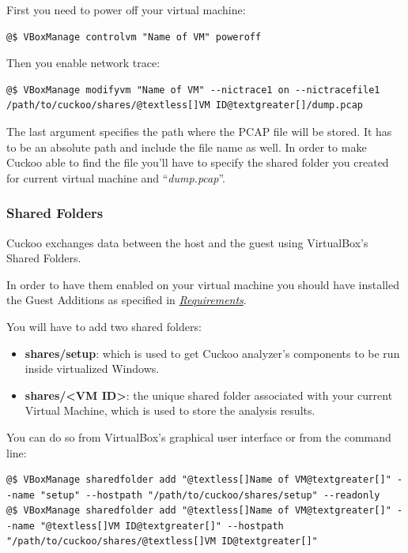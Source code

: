 \documentclass[letterpaper,10pt,english]{sphinxmanual}
\begin{document}
First you need to power off your virtual machine:

\begin{Verbatim}[commandchars=@\[\]]
@$ VBoxManage controlvm "Name of VM" poweroff
\end{Verbatim}

Then you enable network trace:

\begin{Verbatim}[commandchars=@\[\]]
@$ VBoxManage modifyvm "Name of VM" --nictrace1 on --nictracefile1 /path/to/cuckoo/shares/@textless[]VM ID@textgreater[]/dump.pcap
\end{Verbatim}

The last argument specifies the path where the PCAP file will be stored. It has
to be an absolute path and include the file name as well. In order to make
Cuckoo able to find the file you'll have to specify the shared folder you
created for current virtual machine and ``\emph{dump.pcap}''.


\subsubsection{Shared Folders}
\label{installation/guest/shares:shared-folders}\label{installation/guest/shares::doc}\label{installation/guest/shares:here}
Cuckoo exchanges data between the host and the guest using VirtualBox's Shared
Folders.

In order to have them enabled on your virtual machine you should have installed
the Guest Additions as specified in {\hyperref[installation/guest/requirements::doc]{\emph{Requirements}}}.

You will have to add two shared folders:
\begin{itemize}
\item {} 
\textbf{shares/setup}: which is used to get Cuckoo analyzer's components to be run inside virtualized Windows.

\item {} 
\textbf{shares/\textless{}VM ID\textgreater{}}: the unique shared folder associated with your current Virtual Machine, which is used to store the analysis results.

\end{itemize}

You can do so from VirtualBox's graphical user interface or from the command line:

\begin{Verbatim}[commandchars=@\[\]]
@$ VBoxManage sharedfolder add "@textless[]Name of VM@textgreater[]" --name "setup" --hostpath "/path/to/cuckoo/shares/setup" --readonly
@$ VBoxManage sharedfolder add "@textless[]Name of VM@textgreater[]" --name "@textless[]VM ID@textgreater[]" --hostpath "/path/to/cuckoo/shares/@textless[]VM ID@textgreater[]"
\end{Verbatim}
\end{document}
